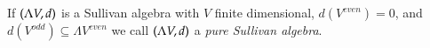 % 
%  

\begin{Definition}
 If $(\Lambda V,d)$ is a Sullivan algebra with $V$ finite dimensional, $d(V^{even}) = 0$,
 and $d(V^{odd}) \subseteq \Lambda V^{even}$ we call $(\Lambda V,d)$ a \emph{pure Sullivan algebra}.
\end{Definition}

